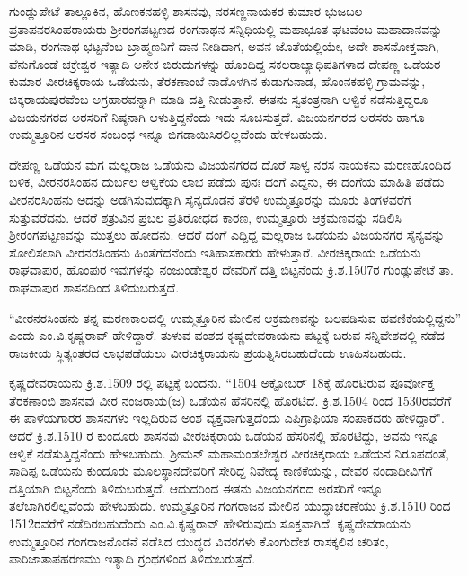ಗುಂಡ್ಲುಪೇಟೆ ತಾಲ್ಲೂಕಿನ, ಹೊಣಕನಹಳ್ಳಿ ಶಾಸನವು, ನರಸಣ್ಣನಾಯಕರ ಕುಮಾರ ಭುಜಬಲ ಪ್ರತಾಪ\break ನರಸಿಂಹರಾಯರು ಶ‍್ರೀರಂಗಪಟ್ಟಣದ ರಂಗನಾಥನ ಸನ್ನಿಧಿಯಲ್ಲಿ ಮಹಾಭೂತ ಘಟವೆಂಬ ಮಹಾದಾನವನ್ನು ಮಾಡಿ, ರಂಗನಾಥ ಭಟ್ಟನೆಂಬ ಬ್ರಾಹ್ಮಣನಿಗೆ ದಾನ ನೀಡಿದಾಗ, ಅವನ ಜೊತೆಯಲ್ಲಿಯೇ, ಅದೇ ಶಾಸನೋಕ್ತವಾಗಿ, ಪೆನುಗೊಂಡೆ ಚಕ್ರೇಶ್ವರ ಇತ್ಯಾದಿ ಅನೇಕ ಬಿರುದುಗಳನ್ನು ಹೊಂದಿದ್ದ ಸಕಲರಾಜ್ಯಾಧಿಪತಿಗಳಾದ ದೇಪಣ್ಣ ಒಡೆಯರ ಕುಮಾರ ವೀರಚಿಕ್ಕರಾಯ ಒಡೆಯನು, ತೆರಕಣಾಂಬೆ ನಾಡೊಳಗಿನ ಕುಡುಗುನಾಡ, ಹೊಂನಕಹಳ್ಳಿ ಗ್ರಾಮವನ್ನು, ಚಿಕ್ಕರಾಯಪುರವೆಂಬ ಅಗ್ರಹಾರವನ್ನಾಗಿ ಮಾಡಿ ದತ್ತಿ ನೀಡುತ್ತಾನೆ. ಈತನು ಸ್ವತಂತ್ರನಾಗಿ ಆಳ್ವಿಕೆ ನಡೆಸುತ್ತಿದ್ದರೂ ವಿಜಯನಗರದ ಅರಸರಿಗೆ ನಿಷ್ಠನಾಗಿ ಆಳುತ್ತಿದ್ದನೆಂದು ಇದು ಸೂಚಿಸುತ್ತದೆ. ವಿಜಯನಗರದ ಅರಸರು ಹಾಗೂ ಉಮ್ಮತ್ತೂರಿನ ಅರಸರ ಸಂಬಂಧ ಇನ್ನೂ ಬಿಗಡಾಯಿಸಿರಲಿಲ್ಲವೆಂದು ಹೇಳಬಹುದು.

ದೇಪಣ್ಣ ಒಡೆಯನ ಮಗ ಮಲ್ಲರಾಜ ಒಡೆಯನು ವಿಜಯನಗರದ ದೊರೆ ಸಾಳ್ವ ನರಸ ನಾಯಕನು ಮರಣಹೊಂದಿದ ಬಳಿಕ, ವೀರನರಸಿಂಹನ ದುರ್ಬಲ ಆಳ್ವಿಕೆಯ ಲಾಭ ಪಡೆದು ಪುನಃ ದಂಗೆ ಎದ್ದನು, ಈ ದಂಗೆಯ ಮಾಹಿತಿ ಪಡೆದು ವೀರನರಸಿಂಹನು ಅದನ್ನು ಅಡಗಿಸುವುದಕ್ಕಾಗಿ ಸೈನ್ಯದೊಡನೆ ತೆರಳಿ ಉಮ್ಮತ್ತೂರನ್ನು ಮೂರು ತಿಂಗಳವರೆಗೆ ಸುತ್ತುವರೆದನು. ಆದರೆ ಶತ್ರುವಿನ ಪ್ರಬಲ ಪ್ರತಿರೋಧದ ಕಾರಣ, ಉಮ್ಮತ್ತೂರು ಆಕ್ರಮಣವನ್ನು ಸಡಿಲಿಸಿ ಶ‍್ರೀರಂಗಪಟ್ಟಣವನ್ನು ಮುತ್ತಲು ಹೋದನು. ಆದರೆ ದಂಗೆ ಎದ್ದಿದ್ದ ಮಲ್ಲರಾಜ ಒಡೆಯನು ವಿಜಯನಗರ ಸೈನ್ಯವನ್ನು ಸೋಲಿಸಲಾಗಿ ವೀರನರಸಿಂಹನು ಹಿಂತೆಗೆದನೆಂದು ಇತಿಹಾಸಕಾರರು ಹೇಳುತ್ತಾರೆ. ವೀರಚಿಕ್ಕರಾಯ ಒಡೆಯನು ರಾಘವಾಪುರ, ಹೊಂಪುರ ಇವುಗಳನ್ನು ನಂಜುಂಡೇಶ್ವರ ದೇವರಿಗೆ ದತ್ತಿ ಬಿಟ್ಟನೆಂದು ಕ್ರಿ.ಶ.1507ರ ಗುಂಡ್ಲುಪೇಟೆ ತಾ. ರಾಘವಾಪುರ ಶಾಸನದಿಂದ ತಿಳಿದುಬರುತ್ತದೆ.

\newpage

“ವೀರನರಸಿಂಹನು ತನ್ನ ಮರಣಕಾಲದಲ್ಲಿ ಉಮ್ಮತ್ತೂರಿನ ಮೇಲಿನ ಆಕ್ರಮಣವನ್ನು ಬಲಪಡಿಸುವ ಹವಣಿಕೆ\-ಯಲ್ಲಿದ್ದನು” ಎಂದು ಎಂ.ವಿ.ಕೃಷ್ಣರಾವ್​ ಹೇಳಿದ್ದಾರೆ. ತುಳುವ ವಂಶದ ಕೃಷ್ಣದೇವರಾಯನು ಪಟ್ಟಕ್ಕೆ ಬರುವ ಸನ್ನಿವೇಶದಲ್ಲಿ ನಡೆದ ರಾಜಕೀಯ ಸ್ಥಿತ್ಯಂತರದ ಲಾಭಪಡೆಯಲು ವೀರಚಿಕ್ಕರಾಯನು ಪ್ರಯತ್ನಿಸಿರಬಹುದೆಂದು ಊಹಿಸಬಹುದು.

ಕೃಷ್ಣದೇವರಾಯನು ಕ್ರಿ.ಶ.1509 ರಲ್ಲಿ ಪಟ್ಟಕ್ಕೆ ಬಂದನು. “1504 ಅಕ್ಟೋಬರ್​ 18ಕ್ಕೆ ಹೊರಟಿರುವ ಪೂರ್ವೋಕ್ತ ತೆರಕಣಾಂಬಿ ಶಾಸನವು ವೀರ ನಂಜರಾಯ(ಜ) ಒಡೆಯನ ಹೆಸರಿನಲ್ಲಿ ಹೊರಟಿದೆ. ಕ್ರಿ.ಶ.1504 ರಿಂದ 1530ರವರೆಗೆ ಈ ಪಾಳೆಯಗಾರರ ಶಾಸನಗಳು ಇಲ್ಲದಿರುವ ಅಂಶ ವ್ಯಕ್ತವಾಗುತ್ತದೆಂದು ಎಪಿಗ್ರಾಫಿಯಾ ಸಂಪಾಕದರು ಹೇಳಿದ್ದಾರೆ". ಆದರೆ ಕ್ರಿ.ಶ.1510 ರ ಕುಂದೂರು ಶಾಸನವು ವೀರಚಿಕ್ಕರಾಯ ಒಡೆಯನ ಹೆಸರಿನಲ್ಲಿ ಹೊರಟಿದ್ದು, ಅವನು ಇನ್ನೂ ಆಳ್ವಿಕೆ ನಡೆಸುತ್ತಿದ್ದನೆಂದು ಹೇಳಬಹುದು. ಶ‍್ರೀಮನ್​ ಮಹಾಮಂಡಲೇಶ್ವರ ವೀರಚಿಕ್ಕರಾಯ ಒಡೆಯನ ನಿರೂಪದಂತೆ, ಸಾದಿಪ್ಪ ಒಡೆಯನು ಕುಂದೂರು ಮೂಲಸ್ಥಾನದೇವರಿಗೆ ಸೇರಿದ್ದ ನಿವೇದ್ಯ ಕಾಣಿಕೆಯನ್ನು, ದೇವರ ನಂದಾದೀವಿಗೆಗೆ ದತ್ತಿಯಾಗಿ ಬಿಟ್ಟನೆಂದು ತಿಳಿದುಬರುತ್ತದೆ. ಆದುದರಿಂದ ಈತನು ವಿಜಯನಗರದ ಅರಸರಿಗೆ ಇನ್ನೂ ತಲೆಬಾಗಿರಲಿಲ್ಲವೆಂದು ಹೇಳ\-ಬಹುದು. ಉಮ್ಮತ್ತೂರಿನ ಗಂಗರಾಜನ ಮೇಲಿನ ಯುದ್ಧಾಚರಣೆಯು ಕ್ರಿ.ಶ.1510 ರಿಂದ 1512ರವರೆಗೆ ನಡೆದಿರಬಹುದೆಂದು ಎಂ.ವಿ.ಕೃಷ್ಣರಾವ್​ ಹೇಳಿರುವುದು ಸೂಕ್ತವಾಗಿದೆ. ಕೃಷ್ಣದೇವರಾಯನು ಉಮ್ಮತ್ತೂರಿನ ಗಂಗರಾಜನೊಡನೆ ನಡೆಸಿದ ಯುದ್ಧದ ವಿವರಗಳು ಕೊಂಗುದೇಶ ರಾಸಕ್ಕಲಿನ ಚರಿತಂ, ಪಾರಿಜಾತಾಪಹರಣಮು ಇತ್ಯಾದಿ ಗ್ರಂಥಗಳಿಂದ ತಿಳಿದುಬರುತ್ತದೆ.

